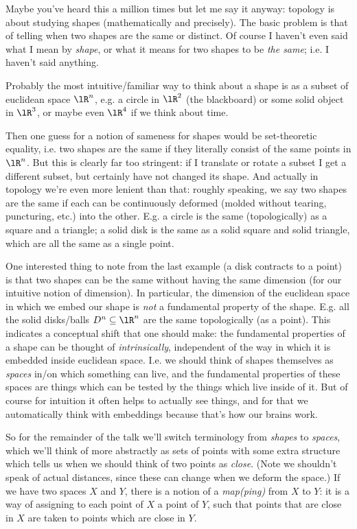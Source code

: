 \begin{nothing}[Shapes]
  Maybe you've heard this a million times but let me say it anyway:
  topology is about studying shapes (mathematically and
  precisely). The basic problem is that of telling when two shapes are
  the same or distinct. Of course I haven't even said what I mean by
  \emph{shape}, or what it means for two shapes to be \emph{the same};
  i.e. I haven't said anything.
  
  Probably the most intuitive/familiar way to think about a shape is
  as a subset of euclidean space $\lR^n$, e.g. a circle in $\lR^2$
  (the blackboard) or some solid object in $\lR^3$, or maybe even
  $\lR^4$ if we think about time.

  Then one guess for a notion of sameness for shapes would be
  set-theoretic equality, i.e. two shapes are the same if they
  literally consist of the same points in $\lR^n$. But this is clearly
  far too stringent: if I translate or rotate a subset I get a
  different subset, but certainly have not changed its shape. And
  actually in topology we're even more lenient than that: roughly
  speaking, we say two shapes are the same if each can be continuously
  deformed (molded without tearing, puncturing, etc.)  into the
  other. E.g. a circle is the same (topologically) as a square and a
  triangle; a solid disk is the same as a solid square and solid
  triangle, which are all the same as a single point.
\end{nothing}

\begin{nothing}[Spaces]
  One interested thing to note from the last example (a disk contracts
  to a point) is that two shapes can be the same without having the
  same dimension (for our intuitive notion of dimension). In
  particular, the dimension of the euclidean space in which we embed
  our shape is \emph{not} a fundamental property of the
  shape. E.g. all the solid disks/balls $D^n \subseteq \lR^n$ are the
  same topologically (as a point). This indicates a conceptual shift
  that one should make: the fundamental properties of a shape can be
  thought of \emph{intrinsically}, independent of the way in which it
  is embedded inside euclidean space. I.e. we should think of shapes
  themselves as \emph{spaces} in/on which something can live, and the
  fundamental properties of these spaces are things which can be
  tested by the things which live inside of it. But of course for
  intuition it often helps to actually see things, and for that we
  automatically think with embeddings because that's how our brains
  work.

  So for the remainder of the talk we'll switch terminology from
  \emph{shapes} to \emph{spaces}, which we'll think of more abstractly
  as sets of points with some extra structure which tells us when we
  should think of two points as \emph{close}. (Note we shouldn't speak
  of actual distances, since these can change when we deform the
  space.) If we have two spaces $X$ and $Y$, there is a notion of a
  \emph{map(ping)} from $X$ to $Y$: it is a way of assigning to each
  point of $X$ a point of $Y$, such that points that are close in $X$
  are taken to points which are close in $Y$.
\end{nothing}

